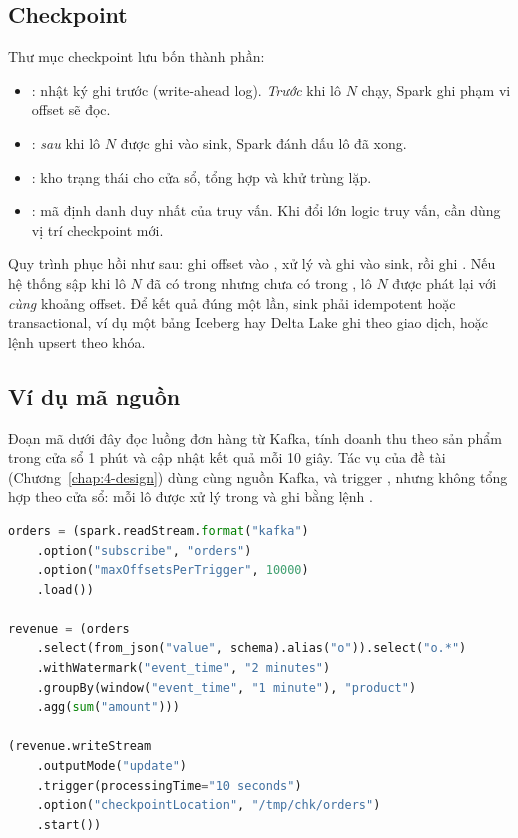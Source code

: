 \subsection{Checkpoint}
\label{sec:2-checkpoint}

Thư mục checkpoint lưu bốn thành phần:
\begin{itemize}
  \item {}: nhật ký ghi trước (write-ahead log). \emph{Trước} khi lô $N$ chạy, Spark ghi phạm vi offset sẽ đọc.
  \item {}: \emph{sau} khi lô $N$ được ghi vào sink, Spark đánh dấu lô đã xong.
  \item {}: kho trạng thái cho cửa sổ, tổng hợp và khử trùng lặp.
  \item {}: mã định danh duy nhất của truy vấn. Khi đổi lớn logic truy vấn, cần dùng vị trí checkpoint mới.
\end{itemize}

Quy trình phục hồi như sau: ghi offset vào , xử lý và ghi vào sink, rồi ghi . Nếu hệ thống sập khi lô $N$ đã có trong  nhưng chưa có trong , lô $N$ được phát lại với \emph{cùng} khoảng offset. Để kết quả đúng một lần, sink phải idempotent hoặc transactional, ví dụ một bảng Iceberg hay Delta Lake ghi theo giao dịch, hoặc lệnh upsert theo khóa.

\subsection{Ví dụ mã nguồn}
\label{sec:2-code}

Đoạn mã dưới đây đọc luồng đơn hàng từ Kafka, tính doanh thu theo sản phẩm trong cửa sổ 1 phút và cập nhật kết quả mỗi 10 giây. Tác vụ của đề tài (Chương~\ref{chap:4-design}) dùng cùng nguồn Kafka,  và trigger , nhưng không tổng hợp theo cửa sổ: mỗi lô được xử lý trong  và ghi bằng lệnh .

\begin{lstlisting}[language=Python, caption={Kafka $\rightarrow$ Spark $\rightarrow$ sink với trigger 10 giây}, label={lst:2-example}]
orders = (spark.readStream.format("kafka")
    .option("subscribe", "orders")
    .option("maxOffsetsPerTrigger", 10000)
    .load())

revenue = (orders
    .select(from_json("value", schema).alias("o")).select("o.*")
    .withWatermark("event_time", "2 minutes")
    .groupBy(window("event_time", "1 minute"), "product")
    .agg(sum("amount")))

(revenue.writeStream
    .outputMode("update")
    .trigger(processingTime="10 seconds")
    .option("checkpointLocation", "/tmp/chk/orders")
    .start())
\end{lstlisting}
